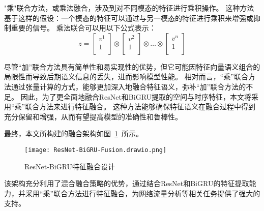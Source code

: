 "乘"联合方法，或乘法融合，涉及到对不同模态的特征进行乘积操作。
这种方法基于这样的假设：一个模态的特征可以通过与另一模态的特征进行乘积来增强或抑制重要的信号。
乘法联合可以用以下公式表示：
\begin{equation}
	z = \begin{bmatrix}v^1 \\1\\\end{bmatrix} \otimes \begin{bmatrix}v^2 \\1\\\end{bmatrix} \otimes \dots \otimes \begin{bmatrix}v^n \\1\\\end{bmatrix}
\end{equation}



尽管“加”联合方法具有简单性和易实现性的优势，但它可能因特征向量语义组合的局限性而导致后期语义信息的丢失，进而影响模型性能。
相对而言，“乘”联合方法通过张量计算的方式，能够更加深入地融合特征语义，弥补“加”联合方法的不足\cite{hejunandzhangcaiqing}。
因此，为了更全面地融合ResNet和BiGRU提取的空间与时序特征，本文将采用“乘”联合方法来进行特征融合。
这种方法能够确保特征语义在融合过程中得到充分保留和增强，从而有望提高模型的准确性和鲁棒性。\par

最终，本文所构建的融合架构如图~\ref{fig:ResNet-BiGRU-Fusion}~所示。
\begin{figure}[htbp]
	\centering
	\texttt{[image: ResNet-BiGRU-Fusion.drawio.png]}
	\caption{ResNet-BiGRU特征融合设计}
	\label{fig:ResNet-BiGRU-Fusion}
\end{figure}
该架构充分利用了混合融合策略的优势，通过结合ResNet和BiGRU的特征提取能力，并采用“乘”联合方法进行特征融合，为网络流量分析等相关任务提供了强大的支持。

